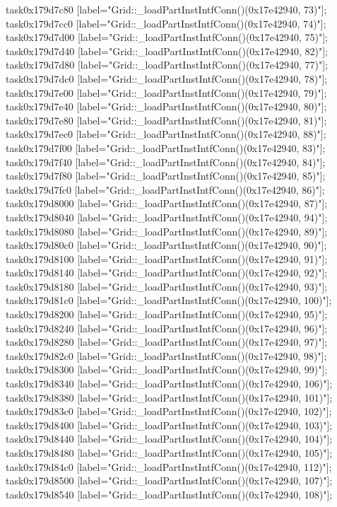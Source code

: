 {	task0x179d7c80 [label="Grid::_loadPartInstIntfConn()(0x17e42940, 73)"];
	task0x179d7cc0 [label="Grid::_loadPartInstIntfConn()(0x17e42940, 74)"];
	task0x179d7d00 [label="Grid::_loadPartInstIntfConn()(0x17e42940, 75)"];
	task0x179d7d40 [label="Grid::_loadPartInstIntfConn()(0x17e42940, 82)"];
	task0x179d7d80 [label="Grid::_loadPartInstIntfConn()(0x17e42940, 77)"];
	task0x179d7dc0 [label="Grid::_loadPartInstIntfConn()(0x17e42940, 78)"];
	task0x179d7e00 [label="Grid::_loadPartInstIntfConn()(0x17e42940, 79)"];
	task0x179d7e40 [label="Grid::_loadPartInstIntfConn()(0x17e42940, 80)"];
	task0x179d7e80 [label="Grid::_loadPartInstIntfConn()(0x17e42940, 81)"];
	task0x179d7ec0 [label="Grid::_loadPartInstIntfConn()(0x17e42940, 88)"];
	task0x179d7f00 [label="Grid::_loadPartInstIntfConn()(0x17e42940, 83)"];
	task0x179d7f40 [label="Grid::_loadPartInstIntfConn()(0x17e42940, 84)"];
	task0x179d7f80 [label="Grid::_loadPartInstIntfConn()(0x17e42940, 85)"];
	task0x179d7fc0 [label="Grid::_loadPartInstIntfConn()(0x17e42940, 86)"];
	task0x179d8000 [label="Grid::_loadPartInstIntfConn()(0x17e42940, 87)"];
	task0x179d8040 [label="Grid::_loadPartInstIntfConn()(0x17e42940, 94)"];
	task0x179d8080 [label="Grid::_loadPartInstIntfConn()(0x17e42940, 89)"];
	task0x179d80c0 [label="Grid::_loadPartInstIntfConn()(0x17e42940, 90)"];
	task0x179d8100 [label="Grid::_loadPartInstIntfConn()(0x17e42940, 91)"];
	task0x179d8140 [label="Grid::_loadPartInstIntfConn()(0x17e42940, 92)"];
	task0x179d8180 [label="Grid::_loadPartInstIntfConn()(0x17e42940, 93)"];
	task0x179d81c0 [label="Grid::_loadPartInstIntfConn()(0x17e42940, 100)"];
	task0x179d8200 [label="Grid::_loadPartInstIntfConn()(0x17e42940, 95)"];
	task0x179d8240 [label="Grid::_loadPartInstIntfConn()(0x17e42940, 96)"];
	task0x179d8280 [label="Grid::_loadPartInstIntfConn()(0x17e42940, 97)"];
	task0x179d82c0 [label="Grid::_loadPartInstIntfConn()(0x17e42940, 98)"];
	task0x179d8300 [label="Grid::_loadPartInstIntfConn()(0x17e42940, 99)"];
	task0x179d8340 [label="Grid::_loadPartInstIntfConn()(0x17e42940, 106)"];
	task0x179d8380 [label="Grid::_loadPartInstIntfConn()(0x17e42940, 101)"];
	task0x179d83c0 [label="Grid::_loadPartInstIntfConn()(0x17e42940, 102)"];
	task0x179d8400 [label="Grid::_loadPartInstIntfConn()(0x17e42940, 103)"];
	task0x179d8440 [label="Grid::_loadPartInstIntfConn()(0x17e42940, 104)"];
	task0x179d8480 [label="Grid::_loadPartInstIntfConn()(0x17e42940, 105)"];
	task0x179d84c0 [label="Grid::_loadPartInstIntfConn()(0x17e42940, 112)"];
	task0x179d8500 [label="Grid::_loadPartInstIntfConn()(0x17e42940, 107)"];
	task0x179d8540 [label="Grid::_loadPartInstIntfConn()(0x17e42940, 108)"];
}
